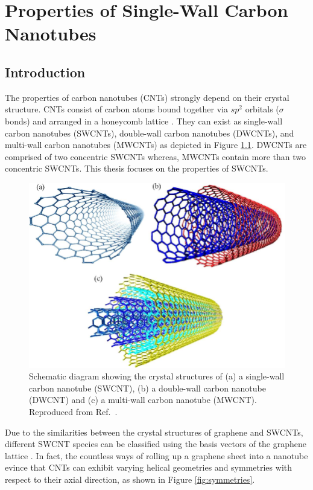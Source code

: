 \chapter{Properties of Single-Wall Carbon Nanotubes}

\section{Introduction}
The properties of carbon nanotubes (CNTs) strongly depend on their crystal structure. CNTs consist of carbon atoms bound together via $sp^2$ orbitals ($\sigma$ bonds) and arranged in a honeycomb lattice \cite{soavi2016ultrafast}. They can exist as single-wall carbon nanotubes (SWCNTs), double-wall carbon nanotubes (DWCNTs), and multi-wall carbon nanotubes (MWCNTs) as depicted in Figure \ref{fig:swcnt_mwcnt}. DWCNTs are comprised of two concentric SWCNTs whereas, MWCNTs contain more than two concentric SWCNTs. This thesis focuses on the properties of SWCNTs.

\begin{figure}[ht]
	\centering
	\includegraphics[scale=1]{images/chapter_optical_props/swcnt_mwcnt_rafiq}
	\caption{Schematic diagram showing the crystal structures of (a) a single-wall carbon nanotube (SWCNT), (b) a double-wall carbon nanotube (DWCNT) and (c) a multi-wall carbon nanotube (MWCNT). Reproduced from Ref.\ \cite{rafique2016exploration}.}
	\label{fig:swcnt_mwcnt}
\end{figure}

Due to the similarities between the crystal structures of graphene and SWCNTs, different SWCNT species can be classified using the basis vectors of the graphene lattice \cite{charlier2007electronic}. In fact, the countless ways of rolling up a graphene sheet into a nanotube evince that CNTs can exhibit varying helical geometries and symmetries with respect to their axial direction, as shown in Figure \ref{fig:symmetries}.

